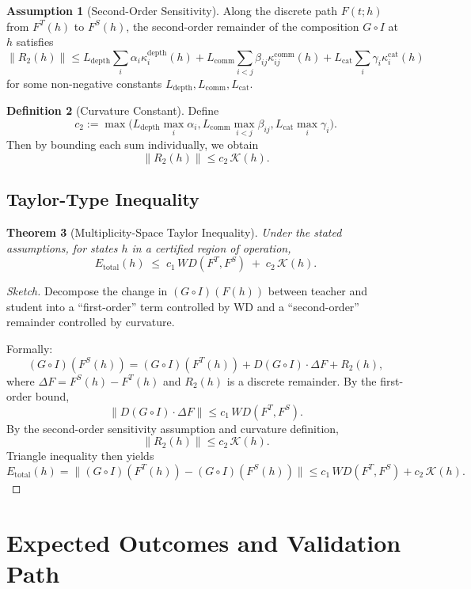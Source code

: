 \documentclass[11pt]{article}
\theoremstyle{definition}
\newtheorem{defn}{Definition}[section]
\newtheorem{assump}[defn]{Assumption}
\theoremstyle{plain}
\newtheorem{thm}[defn]{Theorem}
\theoremstyle{remark}
\begin{document}
\begin{assump}[Second-Order Sensitivity]
Along the discrete path \(F(t;h)\) from \(F^T(h)\) to \(F^S(h)\), the second-order remainder of the composition \(G\circ I\) at \(h\) satisfies
\[
  \|R_2(h)\| \le
  L_{\text{depth}} \sum_{i} \alpha_i \kappa_i^{\text{depth}}(h)
  + L_{\text{comm}} \sum_{i<j} \beta_{ij} \kappa_{ij}^{\text{comm}}(h)
  + L_{\text{cat}} \sum_{i} \gamma_i \kappa_i^{\text{cat}}(h)
\]
for some non-negative constants \(L_{\text{depth}},L_{\text{comm}},L_{\text{cat}}\).
\end{assump}

\begin{defn}[Curvature Constant]
Define
\[
  c_2 := \max\big(
    L_{\text{depth}} \max_i \alpha_i,
    L_{\text{comm}} \max_{i<j} \beta_{ij},
    L_{\text{cat}} \max_i \gamma_i
  \big).
\]
Then by bounding each sum individually, we obtain
\[
  \|R_2(h)\|
  \le c_2 \, \mathcal{K}(h).
\]
\end{defn}

\subsection{Taylor-Type Inequality}

\begin{thm}[Multiplicity-Space Taylor Inequality]
Under the stated assumptions, for states \(h\) in a certified region of operation,
\[
  E_{\text{total}}(h)
  \;\le\;
  c_1 \, WD(F^T,F^S)
  \;+\;
  c_2 \, \mathcal{K}(h).
\]
\end{thm}

\begin{proof}[Sketch]
Decompose the change in \((G\circ I)(F(h))\) between teacher and student into a ``first-order'' term controlled by WD and a ``second-order'' remainder controlled by curvature.

Formally:
\[
  (G\circ I)(F^S(h)) = (G\circ I)(F^T(h)) + D(G\circ I)\cdot \Delta F + R_2(h),
\]
where \(\Delta F = F^S(h) - F^T(h)\) and \(R_2(h)\) is a discrete remainder. By the first-order bound,
\[
  \| D(G\circ I)\cdot \Delta F \|
  \le c_1 \, WD(F^T,F^S).
\]
By the second-order sensitivity assumption and curvature definition,
\[
  \|R_2(h)\| \le c_2 \, \mathcal{K}(h).
\]
Triangle inequality then yields
\[
  E_{\text{total}}(h)
  = \big\| (G\circ I)(F^T(h)) - (G\circ I)(F^S(h)) \big\|
  \le c_1 \, WD(F^T,F^S) + c_2 \, \mathcal{K}(h).
\]
\end{proof}

\section{Expected Outcomes and Validation Path}
\end{document}
